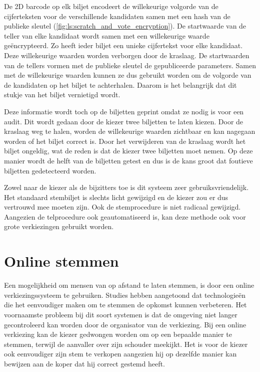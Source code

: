 \npar De 2D barcode op elk biljet encodeert de willekeurige volgorde van de cijferteksten voor de verschillende kandidaten samen met een hash van de publieke sleutel (\ref{fig:ls:scratch_and_vote_encryption}). De startwaarde van de teller van elke kandidaat wordt samen met een willekeurige waarde ge\"encrypteerd. Zo heeft ieder biljet een unieke cijfertekst voor elke kandidaat. Deze willekeurige waarden worden verborgen door de kraslaag. De startwaarden van de tellers vormen met de publieke sleutel de gepubliceerde parameters. Samen met de willekeurige waarden kunnen ze dus gebruikt worden om de volgorde van de kandidaten op het biljet te achterhalen. Daarom is het belangrijk dat dit stukje van het biljet vernietigd wordt.

\npar Deze informatie wordt toch op de biljetten geprint omdat ze nodig is voor een audit. Dit wordt gedaan door de kiezer twee biljetten te laten kiezen. Door de kraslaag weg te halen, worden de willekeurige waarden zichtbaar en kan nagegaan worden of het biljet correct is. Door het verwijderen van de kraslaag wordt het biljet ongeldig, wat de reden is dat de kiezer twee biljetten moet nemen. Op deze manier wordt de helft van de biljetten getest en dus is de kans groot dat foutieve biljetten gedetecteerd worden.

\npar Zowel naar de kiezer als de bijzitters toe is dit systeem zeer gebruiksvriendelijk. Het standaard stembiljet is slechts licht gewijzigd en de kiezer zou er dus vertrouwd mee moeten zijn. Ook de stemprocedure is niet radicaal gewijzigd. Aangezien de telprocedure ook geautomatiseerd is, kan deze methode ook voor grote verkiezingen gebruikt worden.

\section[Online stemmen]{Online stemmen~\cite{adida_helios}}
\label{sec:ls:online_stemmen}

Een mogelijkheid om mensen van op afstand te laten stemmen, is door een online verkiezingssysteem te gebruiken. Studies hebben aangetoond dat technologie\"en die het eenvoudiger maken om te stemmen de opkomst kunnen verbeteren.\cite{news:guardian_shaking_up_voter_apathy_with_it} Het voornaamste probleem bij dit soort systemen is dat de omgeving niet langer gecontroleerd kan worden door de organisator van de verkiezing. Bij een online verkiezing kan de kiezer gedwongen worden om op een bepaalde manier te stemmen, terwijl de aanvaller over zijn schouder meekijkt. Het is voor de kiezer ook eenvoudiger zijn stem te verkopen aangezien hij op dezelfde manier kan bewijzen aan de koper dat hij correct gestemd heeft.

